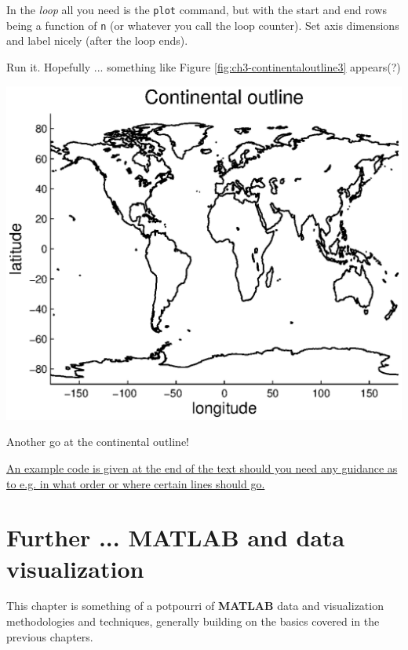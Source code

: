 \documentclass{tufte-book} %
\begin{document}
In the \textit{loop} all you need is the \texttt{plot} command, but with the start and end rows being a function of \texttt{n} (or whatever you call the loop counter). Set axis dimensions and label nicely (after the loop ends).

Run it. Hopefully ... something like Figure \ref{fig:ch3-continentaloutline3} appears(?)

\begin{marginfigure}[0.0in]
\includegraphics[width=\linewidth]{ch3-continentaloutline3.eps}
\caption{Another go at the continental outline!}
\label{fig:ch3-continentaloutline3}
\end{marginfigure}

\uline{An example code is given at the end of the text should you need any guidance as to e.g. in what order or where certain lines should go.}


\chapter{Further ... MATLAB and data visualization}
\label{ch:03}

%
This chapter is something of a potpourri of \textbf{MATLAB} data and visualization methodologies and techniques, generally building on the basics covered in the previous chapters.
\end{document}
